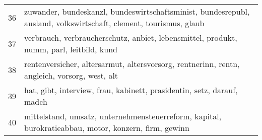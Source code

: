 \documentclass{article}
\begin{document}
\begin{table}[ht]
\begin{center}
\begin{tabular}{rl}
  36 & zuwander, bundeskanzl, bundeswirtschaftsminist, bundesrepubl, ausland, volkswirtschaft, clement, tourismus, glaub \\ 
  37 & verbrauch, verbraucherschutz, anbiet, lebensmittel, produkt, numm, parl, leitbild, kund \\ 
  38 & rentenversicher, altersarmut, altersvorsorg, rentnerinn, rentn, angleich, vorsorg, west, alt \\ 
  39 & hat, gibt, interview, frau, kabinett, prasidentin, setz, darauf, madch \\ 
  40 & mittelstand, umsatz, unternehmensteuerreform, kapital, burokratieabbau, motor, konzern, firm, gewinn \\ 
   \hline
\end{tabular}
\end{center}
\end{table}

 
\end{document}
